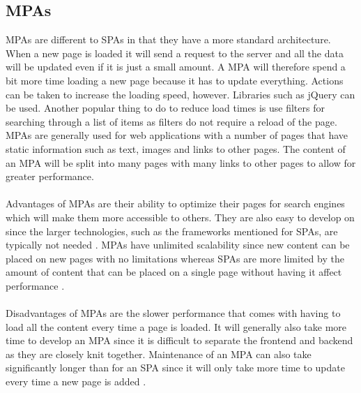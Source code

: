 \subsection{MPAs}
MPAs are different to SPAs in that they have a more standard architecture.
When a new page is loaded it will send a request to the server and all the data will be updated even if it is just a small amount.
A MPA will therefore spend a bit more time loading a new page because it has to update everything.
Actions can be taken to increase the loading speed, however. 
Libraries such as jQuery can be used.
Another popular thing to do to reduce load times is use filters for searching through a list of items as filters do not require a reload of the page.
MPAs are generally used for web applications with a number of pages that have static information such as text, images and links to other pages.
The content of an MPA will be split into many pages with many links to other pages to allow for greater performance.
\\\\
Advantages of MPAs are their ability to optimize their pages for search engines which will make them more accessible to others. 
They are also easy to develop on since the larger technologies, such as the frameworks mentioned for SPAs, are typically not needed \cite{SPAvsMPAMerehead}.
MPAs have unlimited scalability since new content can be placed on new pages with no limitations whereas SPAs are more limited by the amount of content that can be placed on a single page without having it affect performance \cite{SPAvsMPARuby}.
\\\\
Disadvantages of MPAs are the slower performance that comes with having to load all the content every time a page is loaded.
It will generally also take more time to develop an MPA since it is difficult to separate the frontend and backend as they are closely knit together.
Maintenance of an MPA can also take significantly longer than for an SPA since it will only take more time to update every time a new page is added \cite{SPAvsMPARuby}. 

